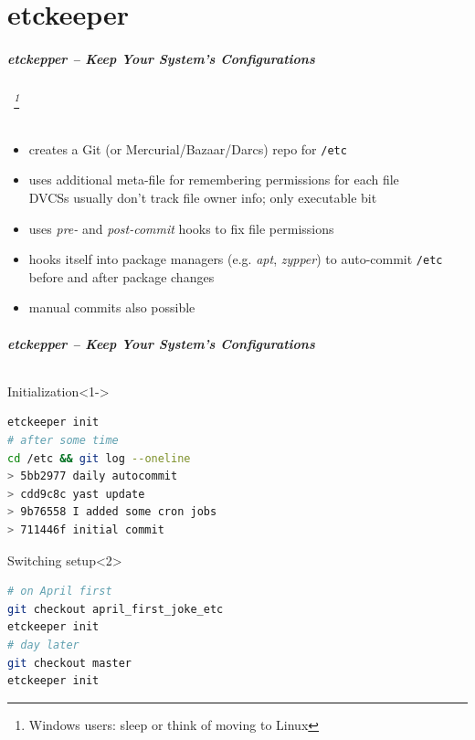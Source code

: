 \documentclass[english,hyperref={pdfpagelabels=false},aspectratio=169]{beamer}
\begin{document}
\part{etckeeper}
\makepart

\begin{frame}[label=etckeeper]
  \frametitle{etckepper -- Keep Your System's Configurations}
  \framesubtitle{~\footnote{\tiny Windows users: sleep or think of moving to Linux}}
  \begin{itemize}
    \item creates a Git {\scriptsize\color{fzjgray50}(or Mercurial/Bazaar/Darcs)} repo for \texttt{/etc}
    \item uses additional meta-file for remembering permissions for each file\\
      {\scriptsize DVCSs usually don't track file owner info; only executable bit}
    \item uses \textit{pre-} and \textit{post-commit} hooks to fix file permissions
    \item hooks itself into package managers {\scriptsize\color{fzjgray50}(e.g. \textit{apt}, \textit{zypper})} to auto-commit \texttt{/etc} \\
      before and after package changes
    \item manual commits also possible
  \end{itemize}
\end{frame}

\begin{frame}[fragile]
  \frametitle{etckepper -- Keep Your System's Configurations}
  \framesubtitle{}
  \begin{block}{Initialization}<1->
    \vspace{-0.75em}
    \begin{lstlisting}[language=zsh]
etckeeper init
# after some time
cd /etc && git log --oneline
> 5bb2977 daily autocommit
> cdd9c8c yast update
> 9b76558 I added some cron jobs
> 711446f initial commit
    \end{lstlisting}
    \vspace{-0.75em}
  \end{block}
  \begin{block}{Switching setup}<2>
    \vspace{-0.75em}
    \begin{lstlisting}[language=zsh]
# on April first
git checkout april_first_joke_etc
etckeeper init
# day later
git checkout master
etckeeper init
    \end{lstlisting}
    \vspace{-0.75em}
  \end{block}
\end{frame}
\end{document}

